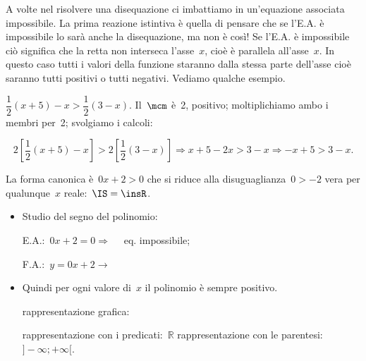 A volte nel risolvere una disequazione ci imbattiamo in un'equazione associata
impossibile. La prima reazione istintiva è quella di pensare che se l'E.A. è
impossibile lo sarà anche la disequazione, ma non è così!
Se l'E.A. è impossibile ciò significa che la retta non interseca l'asse~$x$,
cioè è parallela all'asse~$x$. In questo caso tutti i valori della funzione
staranno dalla stessa parte dell'asse cioè saranno tutti positivi o tutti
negativi. Vediamo qualche esempio.


\begin{esempio}
$\dfrac{1}{2} (x+5)-x>\dfrac{1}{2} (3-x).$
Il~$\mcm$ è~2, positivo; moltiplichiamo ambo i membri per~2; svolgiamo
i calcoli:

\[2 \left[\frac{1}{2}(x+5)-x\right]>2
\left[\frac{1}{2}(3-x)\right]\Rightarrow x+5-2x>3-x\Rightarrow -x+5>3-x.\]

La forma canonica è~$0 x + 2 > 0$ che si riduce alla disuguaglianza~$0>-2$
vera per qualunque~$x$ reale:~$\IS=\insR$.
\begin{itemize} [noitemsep]
 \item Studio del segno del polinomio:\\
 \begin{minipage}{.45\textwidth}
  E.A.:~$0 x + 2 = 0  \Rightarrow \quad $ eq. impossibile;
 \end{minipage}
 \begin{minipage}{.25\textwidth}
  F.A.:~$y=0 x + 2 \rightarrow $
 \end{minipage}
 \begin{minipage}{.3\textwidth}
  
 \end{minipage}
 \item Quindi per ogni valore di~$x$ il polinomio è sempre positivo.
 \subitem
  \begin{minipage}{.35\textwidth}
   rappresentazione grafica:
  \end{minipage}
  \begin{minipage}{.30\textwidth}
   
  \end{minipage}
 \subitem rappresentazione con i predicati:~$\mathbb{R}$
 \subitem rappresentazione con le parentesi:~$]-\infty; +\infty[$.
\end{itemize}
\end{esempio}


